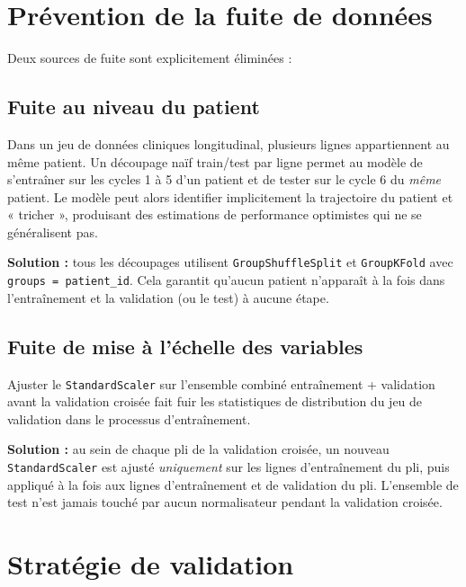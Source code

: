 \documentclass[12pt,a4paper]{report}
\begin{document}
\section{Prévention de la fuite de données}
\label{sec:leakage}

Deux sources de fuite sont explicitement éliminées :

\subsection{Fuite au niveau du patient}

Dans un jeu de données cliniques longitudinal, plusieurs lignes appartiennent au même patient. Un découpage naïf train/test par ligne permet au modèle de s'entraîner sur les cycles 1 à 5 d'un patient et de tester sur le cycle 6 du \emph{même} patient. Le modèle peut alors identifier implicitement la trajectoire du patient et « tricher », produisant des estimations de performance optimistes qui ne se généralisent pas.

\textbf{Solution :} tous les découpages utilisent \texttt{GroupShuffleSplit} et \texttt{GroupKFold} avec \texttt{groups = patient\_id}. Cela garantit qu'aucun patient n'apparaît à la fois dans l'entraînement et la validation (ou le test) à aucune étape.

\subsection{Fuite de mise à l'échelle des variables}

Ajuster le \texttt{StandardScaler} sur l'ensemble combiné entraînement + validation avant la validation croisée fait fuir les statistiques de distribution du jeu de validation dans le processus d'entraînement.

\textbf{Solution :} au sein de chaque pli de la validation croisée, un nouveau \texttt{StandardScaler} est ajusté \emph{uniquement} sur les lignes d'entraînement du pli, puis appliqué à la fois aux lignes d'entraînement et de validation du pli. L'ensemble de test n'est jamais touché par aucun normalisateur pendant la validation croisée.

\section{Stratégie de validation}
\end{document}
